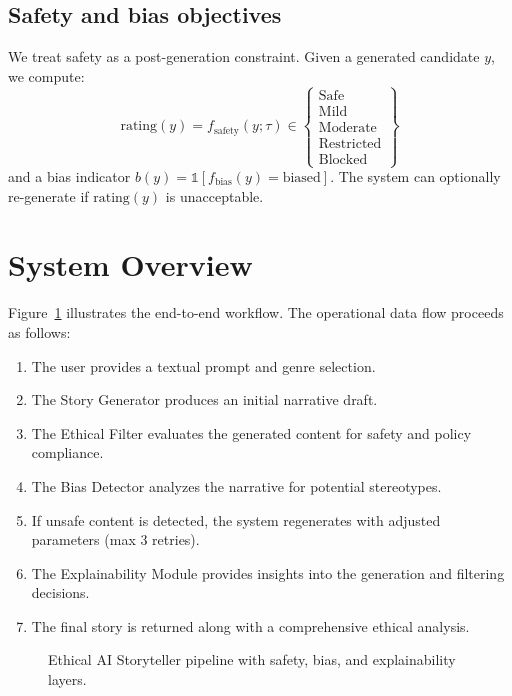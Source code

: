\documentclass[conference]{IEEEtran}
\begin{document}
\subsection{Safety and bias objectives}
We treat safety as a post-generation constraint. Given a generated candidate \(y\), we compute:
\[
\text{rating}(y) = f_{\text{safety}}(y;\tau) \in \left\{
\begin{array}{l}
\text{Safe}\\
\text{Mild}\\
\text{Moderate}\\
\text{Restricted}\\
\text{Blocked}
\end{array}
\right\}
\]
and a bias indicator \(b(y)=\mathbb{1}[f_{\text{bias}}(y)=\text{biased}]\). The system can optionally re-generate if \(\text{rating}(y)\) is unacceptable.

\section{System Overview}
Figure~\ref{fig:arch} illustrates the end-to-end workflow. The operational data flow proceeds as follows:
\begin{enumerate}
    \item The user provides a textual prompt and genre selection.
    \item The Story Generator produces an initial narrative draft.
    \item The Ethical Filter evaluates the generated content for safety and policy compliance.
    \item The Bias Detector analyzes the narrative for potential stereotypes.
    \item If unsafe content is detected, the system regenerates with adjusted parameters (max 3 retries).
    \item The Explainability Module provides insights into the generation and filtering decisions.
    \item The final story is returned along with a comprehensive ethical analysis.
\end{enumerate}

\begin{figure}[t]
    \centering
    \caption{Ethical AI Storyteller pipeline with safety, bias, and explainability layers.}
    \label{fig:arch}
\end{figure}
\end{document}
